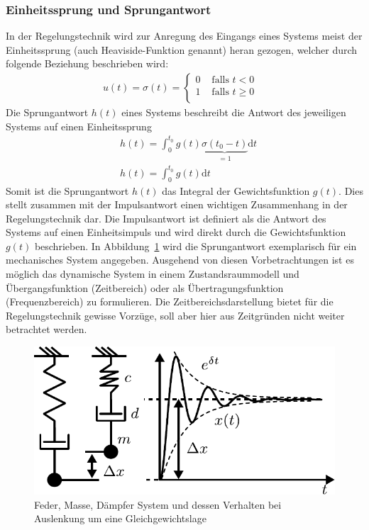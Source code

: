 \subsubsection{Einheitssprung und Sprungantwort}
%
In der Regelungstechnik wird zur Anregung des Eingangs eines Systems meist der Einheitssprung (auch Heaviside-Funktion genannt) heran gezogen, welcher durch folgende Beziehung beschrieben wird:
%
\begin{equation}
\begin{aligned}
u(t)=\sigma(t)=\begin{cases}
0  & \text{ falls } t < 0 \\
1  & \text{ falls } t \ge 0 \\
\end{cases}& \label{eq:einheitssprung}
\end{aligned}
\end{equation}
%
Die Sprungantwort $h(t)$ eines Systems beschreibt die Antwort des jeweiligen Systems auf einen Einheitssprung
%
\begin{equation}
\begin{aligned}
&h(t)=\int_{0}^{t_{0}}g(t)\underbrace{\sigma(t_{0}-t)}_{=1}\text{d}t\\
&h(t)=\int_{0}^{t_{0}}g(t)\text{d}t \label{eq:sprungantwort}
\end{aligned}
\end{equation}
%
Somit ist die Sprungantwort $h(t)$ das Integral der Gewichtsfunktion $g(t)$. Dies stellt zusammen mit der Impulsantwort einen wichtigen Zusammenhang in der Regelungstechnik dar. Die Impulsantwort ist definiert als die Antwort des Systems auf einen Einheitsimpuls und wird direkt durch die Gewichtsfunktion $g(t)$ beschrieben. In Abbildung~\ref{fig:federmassedaempfer} wird die Sprungantwort exemplarisch für ein mechanisches System angegeben.
%
Ausgehend von diesen Vorbetrachtungen ist es möglich das dynamische System in einem Zustandsraummodell und Übergangsfunktion (Zeitbereich) oder als Übertragungsfunktion (Frequenzbereich) zu formulieren. Die Zeitbereichsdarstellung bietet für die Regelungstechnik gewisse Vorzüge, soll aber hier aus Zeitgründen nicht weiter betrachtet werden. 
%
\begin{figure}[h]
	\centering
	\includegraphics[width=0.65\linewidth]{Abbildungen/Modellbildung/PDF/MasseFederDaempfer.pdf}
	\caption{Feder, Masse, Dämpfer System und dessen Verhalten bei Auslenkung um eine Gleichgewichtslage}
	\label{fig:federmassedaempfer}
\end{figure}  
%
